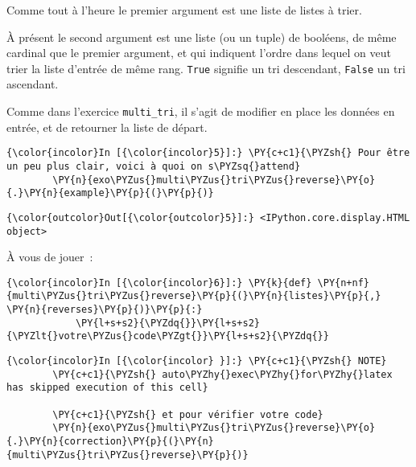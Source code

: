 Comme tout à l'heure le premier argument est une liste de listes à
trier.

À présent le second argument est une liste (ou un tuple) de booléens, de
même cardinal que le premier argument, et qui indiquent l'ordre dans
lequel on veut trier la liste d'entrée de même rang. \texttt{True}
signifie un tri descendant, \texttt{False} un tri ascendant.

Comme dans l'exercice \texttt{multi\_tri}, il s'agit de modifier en
place les données en entrée, et de retourner la liste de départ.

    \begin{Verbatim}[commandchars=\\\{\},frame=single,framerule=0.3mm,rulecolor=\color{cellframecolor}]
{\color{incolor}In [{\color{incolor}5}]:} \PY{c+c1}{\PYZsh{} Pour être un peu plus clair, voici à quoi on s\PYZsq{}attend}
        \PY{n}{exo\PYZus{}multi\PYZus{}tri\PYZus{}reverse}\PY{o}{.}\PY{n}{example}\PY{p}{(}\PY{p}{)}
\end{Verbatim}


\begin{Verbatim}[commandchars=\\\{\},frame=single,framerule=0.3mm,rulecolor=\color{cellframecolor}]
{\color{outcolor}Out[{\color{outcolor}5}]:} <IPython.core.display.HTML object>
\end{Verbatim}
            
    À vous de jouer~:

    \begin{Verbatim}[commandchars=\\\{\},frame=single,framerule=0.3mm,rulecolor=\color{cellframecolor}]
{\color{incolor}In [{\color{incolor}6}]:} \PY{k}{def} \PY{n+nf}{multi\PYZus{}tri\PYZus{}reverse}\PY{p}{(}\PY{n}{listes}\PY{p}{,} \PY{n}{reverses}\PY{p}{)}\PY{p}{:}
            \PY{l+s+s2}{\PYZdq{}}\PY{l+s+s2}{\PYZlt{}votre\PYZus{}code\PYZgt{}}\PY{l+s+s2}{\PYZdq{}}
\end{Verbatim}


    \begin{Verbatim}[commandchars=\\\{\},frame=single,framerule=0.3mm,rulecolor=\color{cellframecolor}]
{\color{incolor}In [{\color{incolor} }]:} \PY{c+c1}{\PYZsh{} NOTE}
        \PY{c+c1}{\PYZsh{} auto\PYZhy{}exec\PYZhy{}for\PYZhy{}latex has skipped execution of this cell}
        
        \PY{c+c1}{\PYZsh{} et pour vérifier votre code}
        \PY{n}{exo\PYZus{}multi\PYZus{}tri\PYZus{}reverse}\PY{o}{.}\PY{n}{correction}\PY{p}{(}\PY{n}{multi\PYZus{}tri\PYZus{}reverse}\PY{p}{)}
\end{Verbatim}



    
    
    
